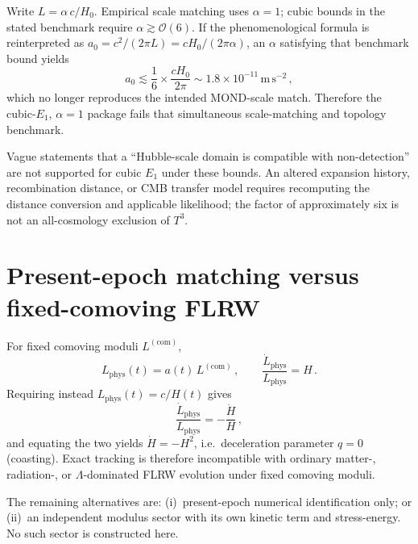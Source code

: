 \documentclass[aps,prd,reprint,superscriptaddress,nofootinbib,floatfix,showkeys]{revtex4-2}
\newcommand{\azero}{a_{0}}
\newcommand{\Hzero}{H_{0}}
\begin{document}
Write \(L=\alpha\,c/\Hzero\).  Empirical scale matching uses \(\alpha=1\);
cubic bounds in the stated benchmark require \(\alpha\gtrsim\mathcal{O}(6)\). If the phenomenological
formula is reinterpreted as \(\azero=c^{2}/(2\pi L)=c\Hzero/(2\pi\alpha)\),
an \(\alpha\) satisfying that benchmark bound yields
\begin{equation}
  \azero \lesssim \frac{1}{6}\times\frac{c\Hzero}{2\pi}
  \sim 1.8\times 10^{-11}\,\mathrm{m\,s^{-2}}\,,
  \label{eq:a0-suppressed}
\end{equation}
which no longer reproduces the intended MOND-scale match.  Therefore the
cubic-\(E_1\), \(\alpha=1\) package fails that simultaneous scale-matching
and topology benchmark.

Vague statements that a ``Hubble-scale domain is compatible with non-detection''
are not supported for cubic \(E_1\) under these bounds.
An altered expansion history, recombination distance, or CMB transfer model
requires recomputing the distance conversion and applicable likelihood;
the factor of approximately six is not an all-cosmology exclusion of \(T^3\).

\section{Present-epoch matching versus fixed-comoving FLRW}
\label{sec:dynamic}

For fixed comoving moduli \(L^{\mathrm{(com)}}\),
\begin{equation}
  L_{\mathrm{phys}}(t)=a(t)\,L^{\mathrm{(com)}}\,,
  \qquad
  \frac{\dot L_{\mathrm{phys}}}{L_{\mathrm{phys}}}=H\,.
  \label{eq:fixed}
\end{equation}
Requiring instead \(L_{\mathrm{phys}}(t)=c/H(t)\) gives
\begin{equation}
  \frac{\dot L_{\mathrm{phys}}}{L_{\mathrm{phys}}}
  = -\frac{\dot H}{H}\,,
  \label{eq:dsm-rate}
\end{equation}
and equating the two yields \(\dot H=-H^{2}\), i.e.\ deceleration parameter
\(q=0\) (coasting).  Exact tracking is therefore incompatible with ordinary
matter-, radiation-, or \(\Lambda\)-dominated FLRW evolution under fixed
comoving moduli.

The remaining alternatives are: (i)~present-epoch numerical identification
only; or (ii)~an independent modulus sector with its own kinetic term and
stress-energy.  No such sector is constructed here.
\end{document}
